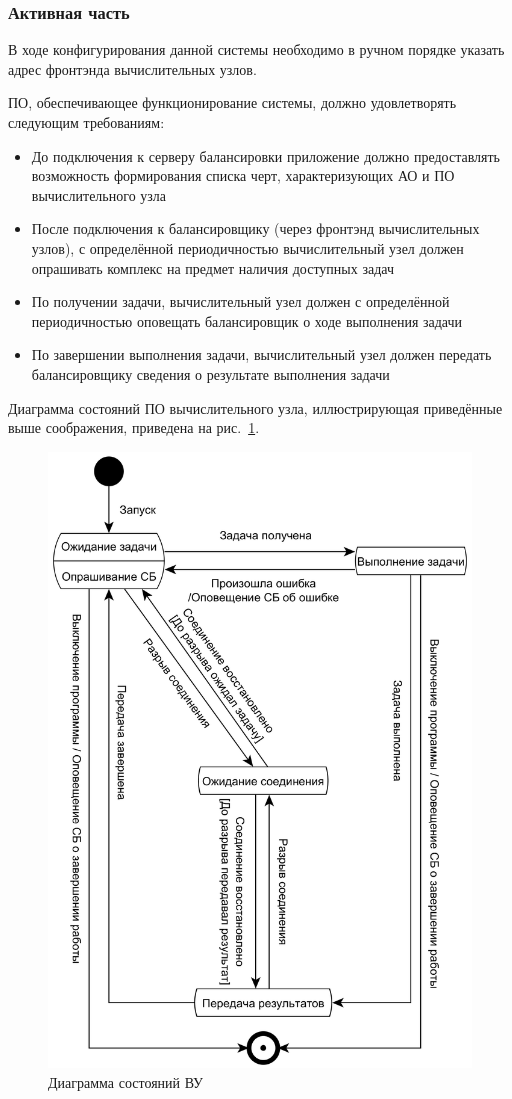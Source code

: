 \documentclass[a4paper,12pt]{report}
\numberwithin{equation}{section}
\begin{document}
\subsubsection{Активная часть}
В ходе конфигурирования данной системы необходимо в ручном порядке указать адрес фронтэнда вычислительных узлов.

ПО, обеспечивающее функционирование системы, должно удовлетворять следующим требованиям:
\begin{itemize}
  \item До подключения к серверу балансировки приложение должно предоставлять возможность формирования списка черт, характеризующих АО и ПО вычислительного узла
  \item После подключения к балансировщику (через фронтэнд вычислительных узлов), с определённой периодичностью вычислительный узел должен опрашивать комплекс на предмет наличия доступных задач
  \item По получении задачи, вычислительный узел должен с определённой периодичностью оповещать балансировщик о ходе выполнения задачи
  \item По завершении выполнения задачи, вычислительный узел должен передать балансировщику сведения о результате выполнения задачи
\end{itemize}

Диаграмма состояний ПО вычислительного узла, иллюстрирующая приведённые выше соображения, приведена на рис.~\ref{fig:node-state}.

\begin{figure}
  \centering
  \includegraphics[width=.6\linewidth]{diagrams/compnode/state}
  \caption{Диаграмма состояний ВУ}
  \label{fig:node-state}
\end{figure}
\end{document}

